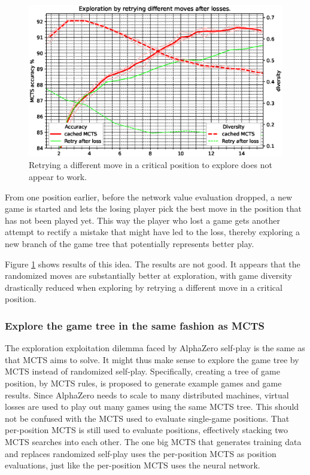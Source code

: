 \documentclass[12pt,onecolumn,oneside,titlepage]{article}
\begin{document}
\begin{figure}[H]
\centering
\includegraphics[clip,width=\columnwidth]{winp_tree}
\caption{Retrying a different move  in a critical position to explore does not appear to work.}
\label{fig:winp_tree}
\end{figure}

From one position earlier, before the network value evaluation dropped, a new game is started and lets the losing player pick the best move in the position that has not been played yet.
This way the player who lost a game gets another attempt to rectify a mistake that might have led to the loss, thereby exploring a new branch of the game tree that potentially represents better play.


Figure \ref{fig:winp_tree} shows results of this idea. The results are not good. It appears that the randomized moves are substantially better at 
exploration, with game diversity drastically reduced when exploring by retrying a different move in a critical position.

\subsubsection{Explore the game tree in the same fashion as MCTS}

The exploration exploitation dilemma faced by AlphaZero self-play is the same as that MCTS aims to solve. It might thus make sense to explore the game tree by MCTS instead of randomized self-play.
Specifically, creating a tree of game position, by MCTS rules, is proposed to generate example games and game results. 
Since AlphaZero needs to scale to many distributed machines, virtual losses \cite{chaslot2008parallel} are used to play out many games 
using the same MCTS tree. This should not be confused with the MCTS used to evaluate single-game positions.
That per-position MCTS is still used to evaluate positions, effectively stacking two MCTS searches into each other. The one big MCTS that generates training data
and replaces randomized self-play uses the per-position MCTS as position evaluations, just like the per-position MCTS uses the neural network.
\end{document}
